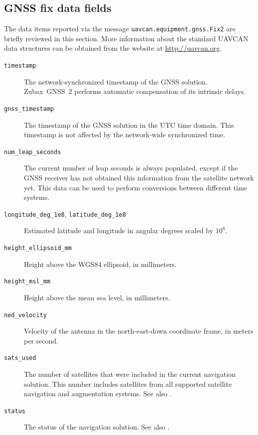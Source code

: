 \documentclass{zubaxdoc}
\begin{document}
\subsection{GNSS fix data fields}

The data items reported via the message \verb|uavcan.equipment.gnss.Fix2| are briefly reviewed in this section.
More information about the standard UAVCAN data structures can be obtained from the website at
\url{http://uavcan.org}.

\begin{description}
    \item[\texttt{timestamp}] The network-synchronized timestamp of the GNSS solution.
    Zubax~GNSS~2 performs automatic compensation of its intrinsic delays.

    \item[\texttt{gnss\_timestamp}] The timestamp of the GNSS solution in the UTC time domain.
    This timestamp is not affected by the network-wide synchronized time.

    \item[\texttt{num\_leap\_seconds}] The current number of leap seconds is always populated,
    except if the GNSS receiver has not obtained this information from the satellite network yet.
    This data can be used to perform conversions between different time systems.

    \item[\texttt{longitude\_deg\_1e8}, \texttt{latitude\_deg\_1e8}] Estimated latitude and longitude
    in angular degrees scaled by $10^8$.

    \item[\texttt{height\_ellipsoid\_mm}] Height above the WGS84 ellipsoid, in millimeters.

    \item[\texttt{height\_msl\_mm}] Height above the mean sea level, in millimeters.

    \item[\texttt{ned\_velocity}] Velocity of the antenna in the north-east-down coordinate frame,
    in meters per second.
    
    \item[\texttt{sats\_used}] The number of satellites that were included in the current navigation solution.
    This number includes satellites from all supported satellite navigation and augmentation systems.
    See also .
    
    \item[\texttt{status}] The status of the navigation solution.
    See also .
    

\end{description}
\end{document}
